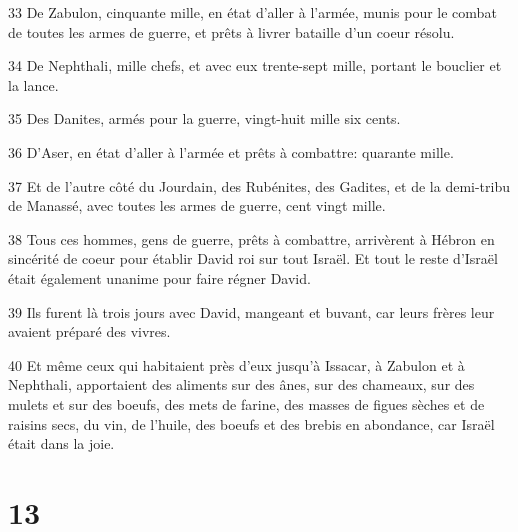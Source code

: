 \par 33 De Zabulon, cinquante mille, en état d'aller à l'armée, munis pour le combat de toutes les armes de guerre, et prêts à livrer bataille d'un coeur résolu.
\par 34 De Nephthali, mille chefs, et avec eux trente-sept mille, portant le bouclier et la lance.
\par 35 Des Danites, armés pour la guerre, vingt-huit mille six cents.
\par 36 D'Aser, en état d'aller à l'armée et prêts à combattre: quarante mille.
\par 37 Et de l'autre côté du Jourdain, des Rubénites, des Gadites, et de la demi-tribu de Manassé, avec toutes les armes de guerre, cent vingt mille.
\par 38 Tous ces hommes, gens de guerre, prêts à combattre, arrivèrent à Hébron en sincérité de coeur pour établir David roi sur tout Israël. Et tout le reste d'Israël était également unanime pour faire régner David.
\par 39 Ils furent là trois jours avec David, mangeant et buvant, car leurs frères leur avaient préparé des vivres.
\par 40 Et même ceux qui habitaient près d'eux jusqu'à Issacar, à Zabulon et à Nephthali, apportaient des aliments sur des ânes, sur des chameaux, sur des mulets et sur des boeufs, des mets de farine, des masses de figues sèches et de raisins secs, du vin, de l'huile, des boeufs et des brebis en abondance, car Israël était dans la joie.

\chapter{13}

